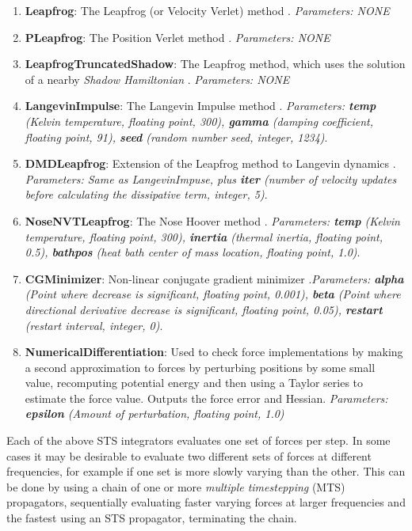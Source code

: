 \documentclass[11pt]{report}
\begin{document}
\begin{enumerate}
\item {\bf Leapfrog}: The Leapfrog (or Velocity Verlet) method \cite{HoEa81}.  {\it Parameters: NONE}
\item {\bf PLeapfrog}: The Position Verlet method \cite{}.  {\it Parameters: NONE}
\item {\bf LeapfrogTruncatedShadow}: The Leapfrog method, which uses the solution of a nearby {\it Shadow Hamiltonian} \cite{ENSD05}.  {\it Parameters: NONE}
\item {\bf LangevinImpulse}: The Langevin Impulse method \cite{SkIz02}.  {\it Parameters: {\bf temp} (Kelvin temperature, floating point, 300), {\bf gamma} (damping coefficient, floating point, 91), {\bf seed} (random number seed, integer, 1234)}.
\item {\bf DMDLeapfrog}: Extension of the Leapfrog method to Langevin dynamics \cite{}.  {\it Parameters: Same as LangevinImpuse, plus {\bf iter} (number of velocity updates before calculating the dissipative term, integer, 5)}.
\item {\bf NoseNVTLeapfrog}: The Nose Hoover method \cite{Nose84, Hoov85}. {\it Parameters: {\bf temp} (Kelvin temperature, floating point, 300), {\bf inertia} (thermal inertia, floating point, 0.5), {\bf bathpos} (heat bath center of mass location, floating point, 1.0)}.  
\item {\bf CGMinimizer}: Non-linear conjugate gradient minimizer \cite{}.{\it Parameters: {\bf alpha} (Point where decrease is significant, floating point, 0.001), {\bf beta} (Point where directional derivative decrease is significant, floating point, 0.05), {\bf restart} (restart interval, integer, 0)}.  
\item {\bf NumericalDifferentiation}: Used to check force implementations by making a second approximation to forces by perturbing positions by some small value, recomputing potential energy and then using a Taylor series to estimate the force value.  Outputs the force error and Hessian.  {\it Parameters: {\bf epsilon} (Amount of perturbation, floating point, 1.0)}
\end{enumerate}


Each of the above STS integrators evaluates one set of forces per
step.  In some cases it may be desirable to evaluate two different
sets of forces at different frequencies, for example if one set
is more slowly varying than the other.  This can be done by
using a chain of one or more {\it multiple timestepping} (MTS)
propagators, sequentially evaluating faster varying forces at 
larger frequencies and the fastest using an STS propagator, terminating
the chain.
\end{document}
